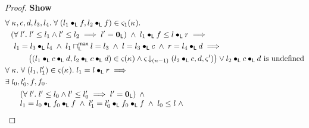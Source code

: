 \begin{lemma}[]
\begin{proof}
\noindent\textbf{Show}
\begin{align}
	&\for{\ca{}, c, d, l_3, l_4}\for{(l_1 \composeL f, l_2 \composeL f) \in \amod{1}(\ca{})} \nonumber\\
	&\hspace*{0.2cm} \left(\for{l'} l' \leq l_1 \land l' \leq l_2 \implies l' = \unitL\right)\;\land\; l_1 \composeL f \leq  l \composeL r \implies \nonumber\\
	&\hspace*{0.4cm}   l_1 = l_3 \composeL l_4 \;\land\; l_1 \maxMeetL l = l_3 \;\land\; l = l_3 \composeL c \;\land\; r = l_4 \composeL d\implies \nonumber\\
	&\hspace*{1cm} \left((l_1 \composeL c \composeL d, l_2 \composeL c \composeL d) \in \amod{}(\ca{}) \land
	\extendsAMUpto{\amod}{(n-1)}{l_2 \composeL c}{d}{\amod{}'}\right) \lor l_2 \composeL c \composeL d \text{ is undefined}\label{L2:Goal1}\\
%	
%	
%	
  &\for{\ca{}} \for{(l_1, l'_1) \in \amod{}(\ca{})} l_1 = l \composeL r \implies \nonumber\\
	&\exsts{l_0, l'_0, f, f_0} \nonumber\\
  &\hspace*{0.5cm}
  \begin{array}{l}
  	\left(\for{l'} l' \leq l_0 \land l' \leq l'_0 \implies l' = \unitL\right)\;\land\\
  	l_1 = l_0 \composeL f_0 \composeL f \;\land\; l'_1 = l'_0 \composeL f_0 \composeL f \;\land\; l_0 \leq l \;\land\\

\end{array}
\end{align}
\end{proof}
\end{lemma}
